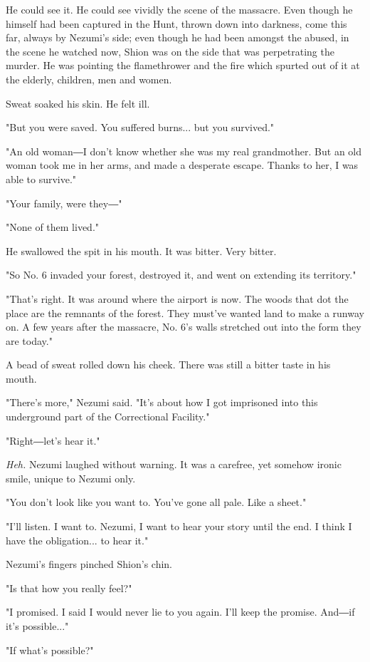 He could see it. He could see vividly the scene of the massacre. Even
though he himself had been captured in the Hunt, thrown down into
darkness, come this far, always by Nezumi's side; even though he had
been amongst the abused, in the scene he watched now, Shion was on the
side that was perpetrating the murder. He was pointing the flamethrower
and the fire which spurted out of it at the elderly, children, men and
women.

Sweat soaked his skin. He felt ill.

"But you were saved. You suffered burns... but you survived."

"An old woman―I don't know whether she was my real grandmother. But an
old woman took me in her arms, and made a desperate escape. Thanks to
her, I was able to survive."

"Your family, were they―"

"None of them lived."

He swallowed the spit in his mouth. It was bitter. Very bitter.

"So No. 6 invaded your forest, destroyed it, and went on extending its
territory."

"That's right. It was around where the airport is now. The woods that
dot the place are the remnants of the forest. They must've wanted land
to make a runway on. A few years after the massacre, No. 6's walls
stretched out into the form they are today."

A bead of sweat rolled down his cheek. There was still a bitter taste in
his mouth.

"There's more," Nezumi said. "It's about how I got imprisoned into this
underground part of the Correctional Facility."

"Right―let's hear it."

\emph{Heh.} Nezumi laughed without warning. It was a carefree, yet somehow
ironic smile, unique to Nezumi only.

"You don't look like you want to. You've gone all pale. Like a sheet."

"I'll listen. I want to. Nezumi, I want to hear your story until the
end. I think I have the obligation... to hear it."

Nezumi's fingers pinched Shion's chin.

"Is that how you really feel?"

"I promised. I said I would never lie to you again. I'll keep the
promise. And―if it's possible..."

"If what's possible?"

